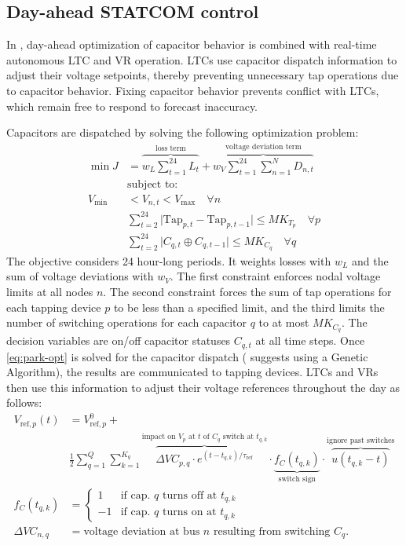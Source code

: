 \documentclass[10pt,letterpaper]{article}
\begin{document}
\subsection{Day-ahead STATCOM control}
In \cite{park2007}, day-ahead optimization of capacitor behavior is combined with real-time autonomous LTC and VR operation. LTCs use capacitor dispatch information to adjust their voltage setpoints, thereby preventing unnecessary tap operations due to capacitor behavior. Fixing capacitor behavior prevents conflict with LTCs, which remain free to respond to forecast inaccuracy.

Capacitors are dispatched by solving the following optimization problem:
\begin{align}\label{eq:park-opt}
\min J &= \overbrace{w_L\sum_{t=1}^{24}L_t}^\text{loss term} + \overbrace{w_V\sum_{t=1}^{24}\sum_{n=1}^{N}D_{n,t}}^\text{voltage deviation term} \\
\nonumber & \text{subject to:} \\
\nonumber V_\text{min} &< V_{n,t} < V_\text{max}\quad\forall n \\
\nonumber &\sum_{t=2}^{24} \lvert \text{Tap}_{p,t} - \text{Tap}_{p,t-1}\rvert \leq MK_{T_p}\quad\forall p \\
\nonumber &\sum_{t=2}^{24}\lvert C_{q,t}\oplus C_{q,t-1}\vert \leq MK_{C_q} \quad\forall q
\end{align}
The objective considers 24 hour-long periods. It weights losses with $w_L$ and the sum of voltage deviations with $w_V$. The first constraint enforces nodal voltage limits at all nodes $n$. The second constraint forces the sum of tap operations for each tapping device $p$ to be less than a specified limit, and the third limits the number of switching operations for each capacitor $q$ to at most $MK_{C_q}$. The decision variables are on/off capacitor statuses $C_{q,t}$ at all time steps. Once \eqref{eq:park-opt} is solved for the capacitor dispatch (\cite{park2007} suggests using a Genetic Algorithm), the results are communicated to tapping devices. LTCs and VRs then use this information to adjust their voltage references throughout the day as follows:
\begin{align}
\nonumber V_{\text{ref},p}(t) &= V_{\text{ref},p}^0 + \\
& \frac{1}{2}\sum_{q=1}^{Q}\sum_{k=1}^{K_q} \overbrace{\Delta VC_{p,q}\cdot e^{(t-t_{q,k})/\tau_\text{ref}}}^\text{impact on $V_p$ at $t$ of $C_q$ switch at $t_{q,k}$}\cdot \underbrace{f_C(t_{q,k})}_\text{switch sign}\cdot \overbrace{u(t_{q,k} - t)}^\text{ignore past switches} \\
f_C(t_{q,k}) &= \begin{cases}
1 &\mbox{if cap. $q$ turns off at }t_{q,k} \\
-1 &\mbox{if cap. $q$ turns on at }t_{q,k}
\end{cases} \\
\Delta VC_{n,q} &= \text{voltage deviation at bus $n$ resulting from switching }C_q.
\end{align}
\end{document}
